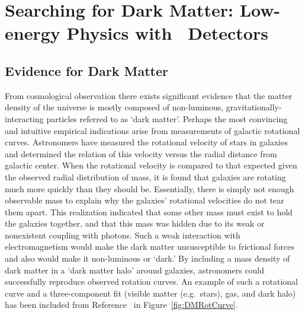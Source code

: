 

	\section{Searching for Dark Matter: Low-energy Physics with \ppc~Detectors}
	
		\subsection{Evidence for Dark Matter}
	From cosmological observation there exists significant evidence that the matter density of the universe is mostly composed of non-luminous, gravitationally-interacting particles referred to as `dark matter'.  Perhaps the most convincing and intuitive empirical indications arise from measurements of galactic rotational curves.  Astronomers have measured the rotational velocity of stars in galaxies and determined the relation of this velocity versus the radial distance from galactic center.  When the rotational velocity is compared to that expected given the observed radial distribution of mass, it is found that galaxies are rotating much more quickly than they should be.  Essentially, there is simply not enough observable mass to explain why the galaxies' rotational velocities do not tear them apart.  This realization indicated that some other mass must exist to hold the galaxies together, and that this mass was hidden due to its weak or nonexistent coupling with photons.  Such a weak interaction with electromagnetism would make the dark matter unsusceptible to frictional forces and also would make it non-luminous or `dark.'  By including a mass density of dark matter in a `dark matter halo' around galaxies, astronomers could successfully reproduce observed rotation curves.  An example of such a rotational curve and a three-component fit (visible matter (e.g.~stars), gas, and dark halo) has been included from Reference~\cite{Begeman:1991iy} in Figure~\ref{fig:DMRotCurve}.

